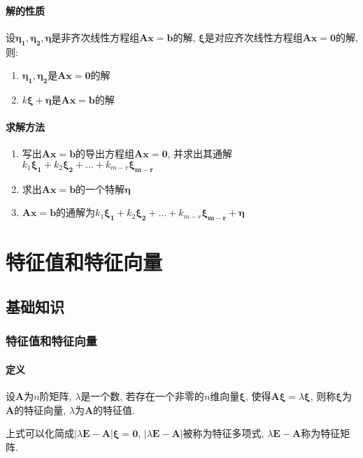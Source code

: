 \subsubsection{解的性质}
设$ \bm{\eta_{1}},\bm{\eta_{2}},\bm{\eta} $是非齐次线性方程组$ \bm{A}\bm{x}=\bm{b} $的解, $ \bm{\xi} $是对应齐次线性方程组$ \bm{A}\bm{x}=\bm{0} $的解, 则:
\begin{enumerate}
\item $ \bm{\eta_{1}},\bm{\eta_{2}} $是$ \bm{A}\bm{x}=\bm{0} $的解
\item $ k\bm{\xi}+\bm{\eta} $是$ \bm{A}\bm{x}=\bm{b} $的解
\end{enumerate}
\subsubsection{求解方法}
\begin{enumerate}
\item 写出$ \bm{A}\bm{x}=\bm{b} $的导出方程组$ \bm{A}\bm{x}=\bm{0} $, 并求出其通解$ k_{1}\bm{\xi_{1}}+k_{2}\bm{\xi_{2}}+...+k_{m-r}\bm{\xi_{m-r}} $
\item 求出$ \bm{A}\bm{x}=\bm{b} $的一个特解$ \bm{\eta} $
\item $ \bm{A}\bm{x}=\bm{b} $的通解为$ k_{1}\bm{\xi_{1}}+k_{2}\bm{\xi_{2}}+...+k_{m-r}\bm{\xi_{m-r}}+\bm{\eta} $
\end{enumerate}
\chapter{特征值和特征向量}
\section{基础知识}
\subsection{特征值和特征向量}
\subsubsection{定义}
设$ \bm{A} $为$ n $阶矩阵, $ \lambda $是一个数, 若存在一个非零的$ n $维向量$ \bm{\xi} $, 使得$ \bm{A}\bm{\xi}=\lambda \bm{\xi} $, 则称$ \bm{\xi} $为$ \bm{A} $的特征向量, $ \lambda $为$ \bm{A} $的特征值. 
\par 上式可以化简成$ \left| \lambda \bm{E}-\bm{A}\right|\bm{\xi}=\bm{0} $, $ \left| \lambda \bm{E}-\bm{A}\right| $被称为特征多项式, $ \lambda \bm{E}-\bm{A} $称为特征矩阵.
